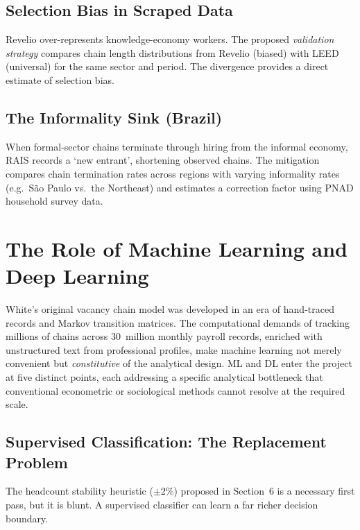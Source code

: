 \documentclass[a4paper]{tufte-handout}
\begin{document}
\subsection{Selection Bias in Scraped Data}
Revelio over-represents knowledge-economy workers. The proposed \emph{validation strategy} compares chain length distributions from Revelio (biased) with LEED (universal) for the same sector and period. The divergence provides a direct estimate of selection bias.

\subsection{The Informality Sink (Brazil)}
When formal-sector chains terminate through hiring from the informal economy, RAIS records a `new entrant', shortening observed chains. The mitigation compares chain termination rates across regions with varying informality rates (e.g.\ São Paulo vs.\ the Northeast) and estimates a correction factor using PNAD household survey data.


\section{The Role of Machine Learning and Deep Learning}

White's original vacancy chain model was developed in an era of hand-traced records and Markov transition matrices. The computational demands of tracking millions of chains across 30~million monthly payroll records, enriched with unstructured text from professional profiles, make machine learning not merely convenient but \emph{constitutive} of the analytical design. ML and DL enter the project at five distinct points, each addressing a specific analytical bottleneck that conventional econometric or sociological methods cannot resolve at the required scale.

\subsection{Supervised Classification: The Replacement Problem}

The headcount stability heuristic (${\pm}2\%$) proposed in Section~6 is a necessary first pass, but it is blunt. A supervised classifier can learn a far richer decision boundary.
\end{document}

